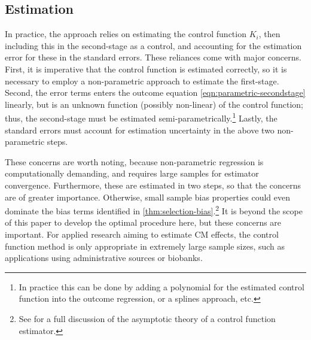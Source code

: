 
\subsection{Estimation}
In practice, the approach relies on estimating the control function $K_i$, then including this in the second-stage as a control, and accounting for the estimation error for these in the standard errors.
These reliances come with major concerns.
First, it is imperative that the control function is estimated correctly, so it is necessary to employ a non-parametric approach to estimate the first-stage.
Second, the error terms enters the outcome equation \eqref{eqn:parametric-secondstage} linearly, but is an unknown function (possibly non-linear) of the control function; thus, the second-stage must be estimated semi-parametrically.\footnote{
    In practice this can be done by adding a polynomial for the estimated control function into the outcome regression, or a splines approach, etc. 
}
Lastly, the standard errors must account for estimation uncertainty in the above two non-parametric steps.

These concerns are worth noting, because non-parametric regression is computationally demanding, and requires large samples for estimator convergence. 
Furthermore, these are estimated in two steps, so that the concerns are of greater importance.
Otherwise, small sample bias properties could even dominate the bias terms identified in \autoref{thm:selection-bias}.\footnote{
    See \cite[Section~6]{imbens2009identification} for a full discussion of the asymptotic theory of a control function estimator.
}
It is beyond the scope of this paper to develop the optimal procedure here, but these concerns are important.
For applied research aiming to estimate CM effects, the control function method is only appropriate in extremely large sample sizes, such as applications using administrative sources or biobanks.


